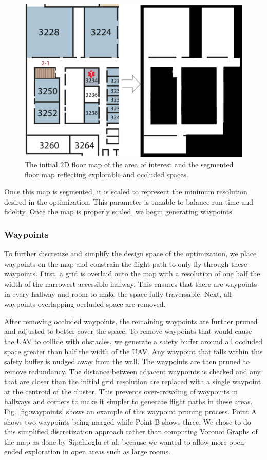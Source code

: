 \documentclass[letterpaper, 10 pt, conference]{ieeeconf}  %
\begin{document}
\begin{figure}
\centering
\includegraphics[width=0.8\linewidth]{figures/map_bw.png}
\caption{The initial 2D floor map of the area of interest and the segmented floor map reflecting explorable and occluded spaces.}
\label{fig:map_gen}
\end{figure}

Once this map is segmented, it is scaled to represent the minimum resolution desired in the optimization. This parameter is tunable to balance run time and fidelity. Once the map is properly scaled, we begin generating waypoints.

\subsubsection{Waypoints}

To further discretize and simplify the design space of the optimization, we place waypoints on the map and constrain the flight path to only fly through these waypoints. First, a grid is overlaid onto the map with a resolution of one half the width of the narrowest accessible hallway. This ensures that there are waypoints in every hallway and room to make the space fully traversable. Next, all waypoints overlapping occluded space are removed.

After removing occluded waypoints, the remaining waypoints are further pruned and adjusted to better cover the space. To remove waypoints that would cause the UAV to collide with obstacles, we generate a safety buffer around all occluded space greater than half the width of the UAV. Any waypoint that falls within this safety buffer is nudged away from the wall. The waypoints are then pruned to remove redundancy. The distance between adjacent waypoints is checked and any that are closer than the initial grid resolution are replaced with a single waypoint at the centroid of the cluster. This prevents over-crowding of waypoints in hallways and corners to make it simpler to generate flight paths in these areas. Fig. \ref{fig:waypoints} shows an example of this waypoint pruning process. Point A shows two waypoints being merged while Point B shows three. We chose to do this simplified discretization approach rather than computing Voronoi Graphs of the map as done by Sipahioglu et al. \cite{Sipahioglu2010} because we wanted to allow more open-ended exploration in open areas such as large rooms.
\end{document}
